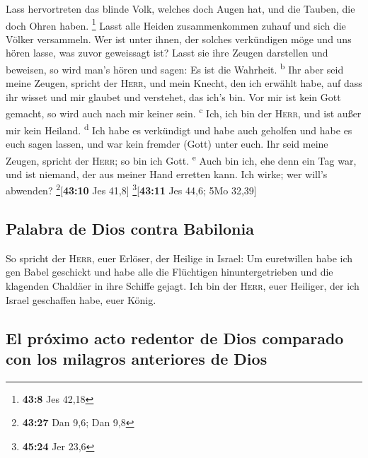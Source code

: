  Lass hervortreten das blinde Volk, welches doch Augen
hat, und die Tauben, die doch Ohren haben. \footnote{\textbf{43:8} Jes
  42,18}  Lasst alle Heiden zusammenkommen zuhauf und sich
die Völker versammeln. Wer ist unter ihnen, der solches verkündigen möge
und uns hören lasse, was zuvor geweissagt ist? Lasst sie ihre Zeugen
darstellen und beweisen, so wird man's hören und sagen: Es ist die
Wahrheit. \textsuperscript{b}  Ihr aber seid meine
Zeugen, spricht der \textsc{Herr}, und mein Knecht, den ich erwählt
habe, auf dass ihr wisset und mir glaubet und verstehet, das ich's bin.
Vor mir ist kein Gott gemacht, so wird auch nach mir keiner sein.
\textsuperscript{c}  Ich, ich bin der \textsc{Herr}, und
ist außer mir kein Heiland. \textsuperscript{d}  Ich habe
es verkündigt und habe auch geholfen und habe es euch sagen lassen, und
war kein fremder (Gott) unter euch. Ihr seid meine Zeugen, spricht der
\textsc{Herr}; so bin ich Gott. \textsuperscript{e}  Auch
bin ich, ehe denn ein Tag war, und ist niemand, der aus meiner Hand
erretten kann. Ich wirke; wer will's abwenden?
\footnote{\textbf{43:27} Dan 9,6; Dan 9,8}{[}\textbf{43:10} Jes 41,8{]}
\footnote{\textbf{45:24} Jer 23,6}{[}\textbf{43:11} Jes 44,6; 5Mo
32,39{]}

\hypertarget{palabra-de-dios-contra-babilonia}{%
\subsection{Palabra de Dios contra
Babilonia}\label{palabra-de-dios-contra-babilonia}}

 So spricht der \textsc{Herr}, euer Erlöser, der Heilige
in Israel: Um euretwillen habe ich gen Babel geschickt und habe alle die
Flüchtigen hinuntergetrieben und die klagenden Chaldäer in ihre Schiffe
gejagt.  Ich bin der \textsc{Herr}, euer Heiliger, der
ich Israel geschaffen habe, euer König.

\hypertarget{el-pruxf3ximo-acto-redentor-de-dios-comparado-con-los-milagros-anteriores-de-dios}{%
\subsection{El próximo acto redentor de Dios comparado con los milagros
anteriores de
Dios}\label{el-pruxf3ximo-acto-redentor-de-dios-comparado-con-los-milagros-anteriores-de-dios}}

